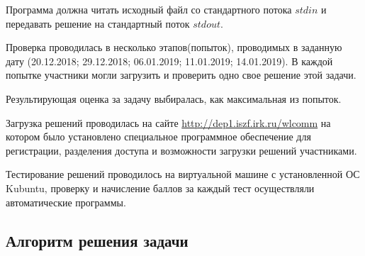 Программа должна читать исходный файл со стандартного потока $stdin$ и передавать решение на стандартный поток $stdout$.

Проверка проводилась в несколько этапов(попыток), проводимых в заданную дату (20.12.2018; 29.12.2018; 06.01.2019; 11.01.2019; 14.01.2019). В каждой попытке участники могли загрузить и проверить одно свое решение этой задачи.

Результирующая оценка за задачу выбиралась, как максимальная из попыток.

Загрузка решений проводилась на сайте \url{http://dep1.iszf.irk.ru/wlcomm} на котором было установлено специальное программное обеспечение для регистрации, разделения доступа и возможности загрузки решений участниками.

Тестирование решений проводилось на виртуальной машине с установленной ОС Kubuntu, проверку и начисление баллов за каждый тест осуществляли автоматические программы.

\subsection*{Алгоритм решения задачи}

